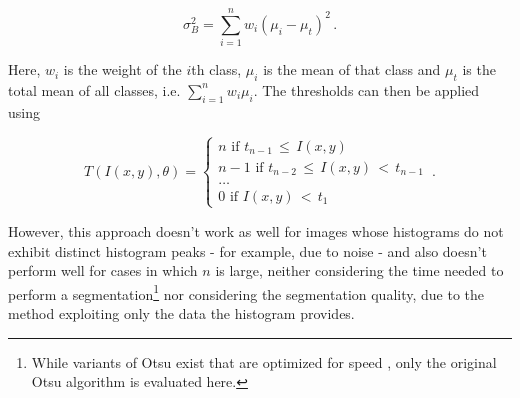 \[ \sigma_B^2 = \sum \limits_{i=1}^{n} w_i (\mu_i - \mu_t)^2 \,. \]

\noindent Here, $w_i$ is the weight of the $i$th class, $\mu_i$ is the mean of that class and $\mu_t$ is the total mean of all classes, i.e. $\sum_{i=1}^{n} w_i \mu_i$. The thresholds can then be applied using

\[ T(I(x, y), \theta) =  \begin{cases}
				n \text{ if } t_{n-1} \, \leq \, I(x, y) \\
				n-1 \text { if } t_{n-2} \, \leq \, I(x, y) \, <  \, t_{n-1}\\
				\dots\\
			           0 \text{ if } I(x, y) \, < \, t_1
			     \end{cases}\,.
\]

\noindent However, this approach doesn't work as well for images whose histograms do not exhibit distinct histogram peaks - for example, due to noise - and also doesn't perform well for cases in which $n$ is large, neither considering the time needed to perform a segmentation\footnote{While variants of Otsu exist that are optimized for speed \cite{otsu_fast}, only the original Otsu algorithm is evaluated here.} nor considering the segmentation quality, due to the method exploiting only the data the histogram provides. \cite{Otsu}




